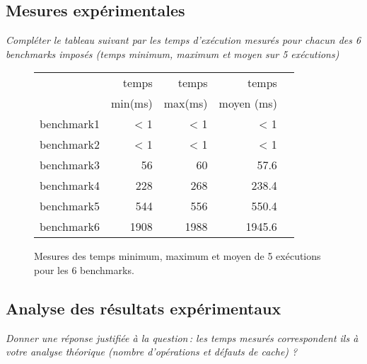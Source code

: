 \documentclass[a4paper, 10pt, french]{article}
\begin{document}
  \subsection{Mesures expérimentales}
    {\em Compléter le tableau suivant par les temps d'exécution mesurés pour chacun des 6 benchmarks imposés
              (temps minimum, maximum et moyen sur 5 exécutions)
    }

    \begin{figure}[h]
      \begin{center}
        \begin{tabular}{|l||r||r|r|r||}
          \hline
          \hline
            & temps     & temps   & temps     \\
            & min(ms)  & max(ms)  & moyen (ms)\\
          \hline
          \hline
            benchmark1 & < 1 & < 1 & < 1 \\
          \hline
            benchmark2 & < 1 & < 1 & < 1 \\
          \hline
            benchmark3 & 56 & 60 & 57.6 \\
          \hline
            benchmark4 & 228 & 268 & 238.4 \\
          \hline
            benchmark5 & 544 & 556 & 550.4 \\
          \hline
            benchmark6 & 1908 & 1988 & 1945.6 \\
          \hline
          \hline
        \end{tabular}
        \caption{Mesures des temps minimum, maximum et moyen de 5 exécutions pour les 6 benchmarks.}
        \label{table-temps}
      \end{center}
    \end{figure}

\subsection{Analyse des résultats expérimentaux}
{\em Donner  une réponse justifiée  à la question\,: 
              les  temps mesurés correspondent ils  à votre analyse théorique (nombre d’opérations et défauts de cache) ?
}
\end{document}
